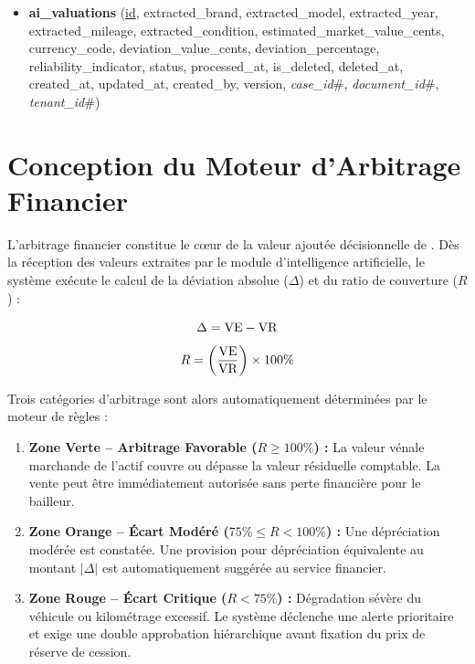 \begin{sloppypar}
\begin{itemize}
    \item \textbf{ai\_valuations} (\underline{id}, extracted\_brand, extracted\_model, extracted\_year, extracted\_mileage, extracted\_condition, estimated\_market\_value\_cents, currency\_code, deviation\_value\_cents, deviation\_percentage, reliability\_indicator, status, processed\_at, is\_deleted, deleted\_at, created\_at, updated\_at, created\_by, version, \textit{case\_id}\#, \textit{document\_id}\#, \textit{tenant\_id}\#)
\end{itemize}
\end{sloppypar}

\section{Conception du Moteur d'Arbitrage Financier}

L'arbitrage financier constitue le cœur de la valeur ajoutée décisionnelle de \projectShortTitle. Dès la réception des valeurs extraites par le module d'intelligence artificielle, le système exécute le calcul de la déviation absolue ($\Delta$) et du ratio de couverture ($R$) :

\begin{equation}
    \Delta = \text{VE} - \text{VR}
\end{equation}
\begin{equation}
    R = \left( \frac{\text{VE}}{\text{VR}} \right) \times 100\%
\end{equation}

Trois catégories d'arbitrage sont alors automatiquement déterminées par le moteur de règles :
\begin{enumerate}
    \item \textbf{Zone Verte -- Arbitrage Favorable ($R \ge 100\%$) :} La valeur vénale marchande de l'actif couvre ou dépasse la valeur résiduelle comptable. La vente peut être immédiatement autorisée sans perte financière pour le bailleur.
    \item \textbf{Zone Orange -- Écart Modéré ($75\% \le R < 100\%$) :} Une dépréciation modérée est constatée. Une provision pour dépréciation équivalente au montant $|\Delta|$ est automatiquement suggérée au service financier.
    \item \textbf{Zone Rouge -- Écart Critique ($R < 75\%$) :} Dégradation sévère du véhicule ou kilométrage excessif. Le système déclenche une alerte prioritaire et exige une double approbation hiérarchique avant fixation du prix de réserve de cession.
\end{enumerate}

